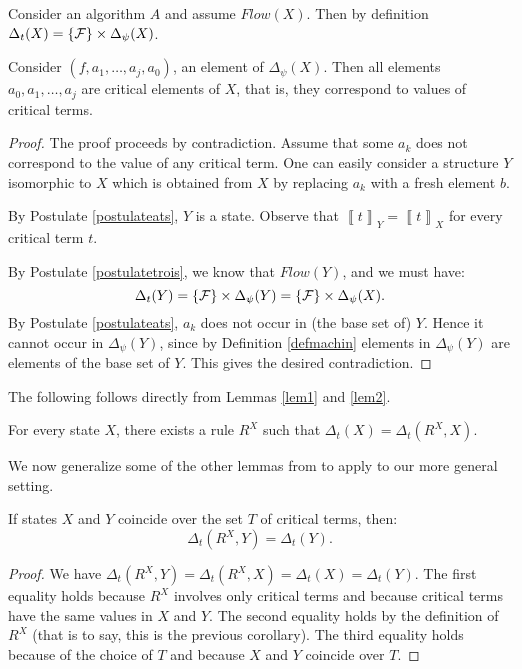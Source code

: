 \documentclass[envcountsame]{llncs}
\newcommand{\Continuous}[1]{\mathit{Flow}(#1)}   \newcommand{\notContinuous}[1]{\mathit{Jump}(#1)}   \newcommand{\Machine}{\textsc{Dynamic}}
\newcommand{\evaluation}[2][]{\ensuremath{\left\llbracket #2\right\rrbracket_{#1}}}
\newcommand{\val}[2]{\evaluation[#2]{#1}}
\newcommand{\update}[3]{(#1,#2,#3)}\spnewtheorem{postulate}{Postulate}{\bfseries}{\itshape}
\newcommand{\gen}[1]{\Delta_t(#1)}
\newcommand\Deltapsi{\Delta_\psi}
\begin{document}
\begin{lemma} \label{lem2}
Consider an algorithm $A$ and assume $\Continuous{X}$. Then by definition
$\gen{X}=\C{\Deltapsi(X)}$.

Consider $\update{f}{a_1,\dots,a_j}{a_0}$,
an element of $\Deltapsi(X)$.  Then all elements $a_0,a_1,\dots,a_j$
are critical elements of $X$, that is, they correspond  to values of critical terms.
\end{lemma}

\begin{proof}
The proof proceeds by contradiction. Assume that some $a_k$ does not correspond to the
value of any critical term.  One can easily consider a structure $Y$ isomorphic to $X$ which is obtained from $X$ by
replacing $a_k$ with a fresh element $b$.

By Postulate
\ref{postulateats}, $Y$ is a state. Observe that $\val{t}{Y}=\val{t}{X}$ for every
 critical term $t$.

By Postulate \ref{postulatetrois}, we know that
$\Continuous{Y}$, and we must have:
$$\gen{Y}=\C{\Deltapsi(Y)}=\C{\Deltapsi(X)}.$$
By Postulate \ref{postulateats},
$a_k$ does not occur in  (the base set of)  $Y$. Hence it cannot occur in
$\Deltapsi(Y)$, since by Definition \ref{defmachin} elements in $\Deltapsi(Y)$ are
elements of the base set of $Y$. This gives the desired
contradiction.
\end{proof}





The following follows directly from Lemmas \ref{lem1} and \ref{lem2}.

\begin{corollary}
For every state $X$, there exists a
rule $R^X$ such that $\gen{X}=\gen{R^X,X}$.



\end{corollary}

We now generalize some of the other lemmas from \cite{Gur00} to apply to our
more general setting.

\begin{lemma}
\label{sixsept}
If states $X$ and $Y$ coincide over the set $T$ of critical terms,
then:
$$\gen{R^X,Y} = \gen{Y}.$$
\end{lemma}

\begin{proof}
We have $\gen{R^X,Y}=\gen{R^X,X}=\gen{X}=\gen{Y}$.
The first equality holds because $R^X$ involves only critical terms
and because critical terms have the same values in $X$ and $Y$. The
second equality holds by the definition of $R^X$ (that is to say, this
is the previous corollary). The third equality
holds because of the choice of $T$ and because $X$ and $Y$ coincide
over $T$.
\end{proof}
\end{document}
